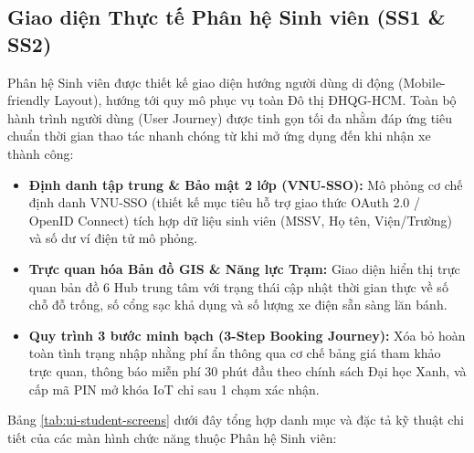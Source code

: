 \documentclass[12pt,a4paper]{article}
\begin{document}
\clearpage
\clearpage
\subsection{Giao diện Thực tế Phân hệ Sinh viên (SS1 \& SS2)}
Phân hệ Sinh viên được thiết kế giao diện hướng người dùng di động (Mobile-friendly Layout), hướng tới quy mô phục vụ toàn Đô thị ĐHQG-HCM. Toàn bộ hành trình người dùng (User Journey) được tinh gọn tối đa nhằm đáp ứng tiêu chuẩn thời gian thao tác nhanh chóng từ khi mở ứng dụng đến khi nhận xe thành công:
\begin{itemize}[nosep]
    \item \textbf{Định danh tập trung \& Bảo mật 2 lớp (VNU-SSO):} Mô phỏng cơ chế định danh VNU-SSO (thiết kế mục tiêu hỗ trợ giao thức OAuth 2.0 / OpenID Connect) tích hợp dữ liệu sinh viên (MSSV, Họ tên, Viện/Trường) và số dư ví điện tử mô phỏng.
    \item \textbf{Trực quan hóa Bản đồ GIS \& Năng lực Trạm:} Giao diện hiển thị trực quan bản đồ 6 Hub trung tâm với trạng thái cập nhật thời gian thực về số chỗ đỗ trống, số cổng sạc khả dụng và số lượng xe điện sẵn sàng lăn bánh.
    \item \textbf{Quy trình 3 bước minh bạch (3-Step Booking Journey):} Xóa bỏ hoàn toàn tình trạng nhập nhằng phí ẩn thông qua cơ chế bảng giá tham khảo trực quan, thông báo miễn phí 30 phút đầu theo chính sách Đại học Xanh, và cấp mã PIN mở khóa IoT chỉ sau 1 chạm xác nhận.
\end{itemize}

Bảng \ref{tab:ui-student-screens} dưới đây tổng hợp danh mục và đặc tả kỹ thuật chi tiết của các màn hình chức năng thuộc Phân hệ Sinh viên:
\end{document}

